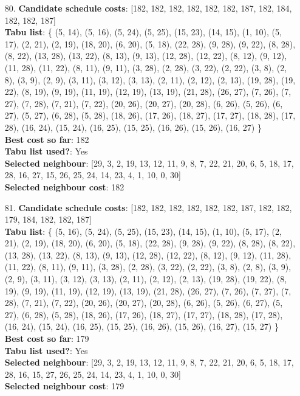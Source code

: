 \documentclass[fleqn]{article}
\begin{document}
\begin{itemize}
    \item[80.] \textbf{Candidate schedule costs}: [182, 182, 182, 182, 182, 182, 187, 182, 184, 182, 182, 187] \\
    \textbf{Tabu list}: \{ (5, 14), (5, 16), (5, 24), (5, 25), (15, 23), (14, 15), (1, 10), (5, 17), (2, 21), (2, 19), (18, 20), (6, 20), (5, 18), (22, 28), (9, 28), (9, 22), (8, 28), (8, 22), (13, 28), (13, 22), (8, 13), (9, 13), (12, 28), (12, 22), (8, 12), (9, 12), (11, 28), (11, 22), (8, 11), (9, 11), (3, 28), (2, 28), (3, 22), (2, 22), (3, 8), (2, 8), (3, 9), (2, 9), (3, 11), (3, 12), (3, 13), (2, 11), (2, 12), (2, 13), (19, 28), (19, 22), (8, 19), (9, 19), (11, 19), (12, 19), (13, 19), (21, 28), (26, 27), (7, 26), (7, 27), (7, 28), (7, 21), (7, 22), (20, 26), (20, 27), (20, 28), (6, 26), (5, 26), (6, 27), (5, 27), (6, 28), (5, 28), (18, 26), (17, 26), (18, 27), (17, 27), (18, 28), (17, 28), (16, 24), (15, 24), (16, 25), (15, 25), (16, 26), (15, 26), (16, 27) \} \\
    \textbf{Best cost so far}: 182 \\
    \textbf{Tabu list used?}: Yes \\
    \textbf{Selected neighbour}: [29, 3, 2, 19, 13, 12, 11, 9, 8, 7, 22, 21, 20, 6, 5, 18, 17, 28, 16, 27, 15, 26, 25, 24, 14, 23, 4, 1, 10, 0, 30] \\
    \textbf{Selected neighbour cost}: 182
      

    \item[81.] \textbf{Candidate schedule costs}: [182, 182, 182, 182, 182, 182, 187, 182, 182, 179, 184, 182, 182, 187] \\
    \textbf{Tabu list}: \{ (5, 16), (5, 24), (5, 25), (15, 23), (14, 15), (1, 10), (5, 17), (2, 21), (2, 19), (18, 20), (6, 20), (5, 18), (22, 28), (9, 28), (9, 22), (8, 28), (8, 22), (13, 28), (13, 22), (8, 13), (9, 13), (12, 28), (12, 22), (8, 12), (9, 12), (11, 28), (11, 22), (8, 11), (9, 11), (3, 28), (2, 28), (3, 22), (2, 22), (3, 8), (2, 8), (3, 9), (2, 9), (3, 11), (3, 12), (3, 13), (2, 11), (2, 12), (2, 13), (19, 28), (19, 22), (8, 19), (9, 19), (11, 19), (12, 19), (13, 19), (21, 28), (26, 27), (7, 26), (7, 27), (7, 28), (7, 21), (7, 22), (20, 26), (20, 27), (20, 28), (6, 26), (5, 26), (6, 27), (5, 27), (6, 28), (5, 28), (18, 26), (17, 26), (18, 27), (17, 27), (18, 28), (17, 28), (16, 24), (15, 24), (16, 25), (15, 25), (16, 26), (15, 26), (16, 27), (15, 27) \} \\
    \textbf{Best cost so far}: 179 \\
    \textbf{Tabu list used?}: Yes \\
    \textbf{Selected neighbour}: [29, 3, 2, 19, 13, 12, 11, 9, 8, 7, 22, 21, 20, 6, 5, 18, 17, 28, 16, 15, 27, 26, 25, 24, 14, 23, 4, 1, 10, 0, 30] \\
    \textbf{Selected neighbour cost}: 179
      


\end{itemize}
\end{document}
